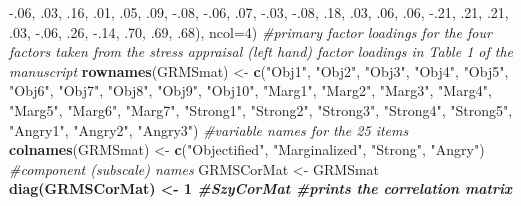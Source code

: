 \documentclass[
  english,
]{book}
\newenvironment{Shaded}{\begin{snugshade}}{\end{snugshade}}
\newcommand{\CommentTok}[1]{\textcolor[rgb]{0.56,0.35,0.01}{\textit{#1}}}
\newcommand{\DataTypeTok}[1]{\textcolor[rgb]{0.13,0.29,0.53}{#1}}
\newcommand{\DecValTok}[1]{\textcolor[rgb]{0.00,0.00,0.81}{#1}}
\newcommand{\FloatTok}[1]{\textcolor[rgb]{0.00,0.00,0.81}{#1}}
\newcommand{\KeywordTok}[1]{\textcolor[rgb]{0.13,0.29,0.53}{\textbf{#1}}}
\newcommand{\NormalTok}[1]{#1}
\newcommand{\OperatorTok}[1]{\textcolor[rgb]{0.81,0.36,0.00}{\textbf{#1}}}
\newcommand{\StringTok}[1]{\textcolor[rgb]{0.31,0.60,0.02}{#1}}
\begin{document}
\begin{Shaded}
\begin{Highlighting}[]
                  \FloatTok{-.06}\NormalTok{, }\FloatTok{.03}\NormalTok{, }\FloatTok{.16}\NormalTok{, }\FloatTok{.01}\NormalTok{, }\FloatTok{.05}\NormalTok{, }\FloatTok{.09}\NormalTok{, }\FloatTok{-.08}\NormalTok{, }\FloatTok{-.06}\NormalTok{, }\FloatTok{.07}\NormalTok{, }\FloatTok{-.03}\NormalTok{, }\FloatTok{-.08}\NormalTok{, }\FloatTok{.18}\NormalTok{, }\FloatTok{.03}\NormalTok{, }\FloatTok{.06}\NormalTok{, }\FloatTok{.06}\NormalTok{, }\FloatTok{-.21}\NormalTok{, }\FloatTok{.21}\NormalTok{, }\FloatTok{.21}\NormalTok{, }\FloatTok{.03}\NormalTok{, }\FloatTok{-.06}\NormalTok{, }\FloatTok{.26}\NormalTok{, }\FloatTok{-.14}\NormalTok{, }\FloatTok{.70}\NormalTok{, }\FloatTok{.69}\NormalTok{, }\FloatTok{.68}\NormalTok{), }\DataTypeTok{ncol=}\DecValTok{4}\NormalTok{) }\CommentTok{#primary factor loadings for the four factors taken from the stress appraisal (left hand) factor loadings in Table 1 of the manuscript}
\KeywordTok{rownames}\NormalTok{(GRMSmat) <-}\StringTok{ }\KeywordTok{c}\NormalTok{(}\StringTok{"Obj1"}\NormalTok{, }\StringTok{"Obj2"}\NormalTok{, }\StringTok{"Obj3"}\NormalTok{, }\StringTok{"Obj4"}\NormalTok{, }\StringTok{"Obj5"}\NormalTok{, }\StringTok{"Obj6"}\NormalTok{, }\StringTok{"Obj7"}\NormalTok{, }\StringTok{"Obj8"}\NormalTok{, }\StringTok{"Obj9"}\NormalTok{, }\StringTok{"Obj10"}\NormalTok{, }\StringTok{"Marg1"}\NormalTok{, }\StringTok{"Marg2"}\NormalTok{, }\StringTok{"Marg3"}\NormalTok{, }\StringTok{"Marg4"}\NormalTok{, }\StringTok{"Marg5"}\NormalTok{, }\StringTok{"Marg6"}\NormalTok{, }\StringTok{"Marg7"}\NormalTok{, }\StringTok{"Strong1"}\NormalTok{, }\StringTok{"Strong2"}\NormalTok{, }\StringTok{"Strong3"}\NormalTok{, }\StringTok{"Strong4"}\NormalTok{, }\StringTok{"Strong5"}\NormalTok{, }\StringTok{"Angry1"}\NormalTok{, }\StringTok{"Angry2"}\NormalTok{, }\StringTok{"Angry3"}\NormalTok{) }\CommentTok{#variable names for the 25 items}
\KeywordTok{colnames}\NormalTok{(GRMSmat) <-}\StringTok{ }\KeywordTok{c}\NormalTok{(}\StringTok{"Objectified"}\NormalTok{, }\StringTok{"Marginalized"}\NormalTok{, }\StringTok{"Strong"}\NormalTok{, }\StringTok{"Angry"}\NormalTok{) }\CommentTok{#component (subscale) names}
\NormalTok{GRMSCorMat <-}\StringTok{ }\NormalTok{GRMSmat }\OperatorTok{%
\KeywordTok{diag}\NormalTok{(GRMSCorMat) <-}\StringTok{ }\DecValTok{1}
\CommentTok{#SzyCorMat #prints the correlation matrix}
}
\end{Highlighting}
\end{Shaded}
\end{document}
